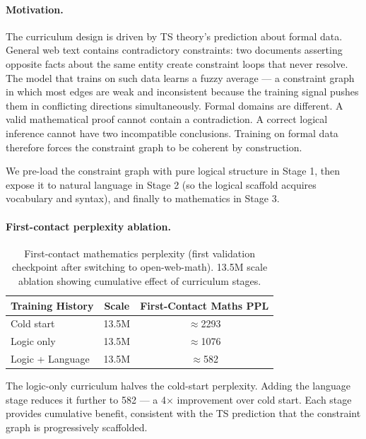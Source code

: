 \documentclass[10pt,a4paper]{article}
\begin{document}
\paragraph{Motivation.} The curriculum design is driven by TS theory's prediction about formal data. General web text contains contradictory constraints: two documents asserting opposite facts about the same entity create constraint loops that never resolve. The model that trains on such data learns a fuzzy average --- a constraint graph in which most edges are weak and inconsistent because the training signal pushes them in conflicting directions simultaneously. Formal domains are different. A valid mathematical proof cannot contain a contradiction. A correct logical inference cannot have two incompatible conclusions. Training on formal data therefore forces the constraint graph to be coherent by construction.

We pre-load the constraint graph with pure logical structure in Stage 1, then expose it to natural language in Stage 2 (so the logical scaffold acquires vocabulary and syntax), and finally to mathematics in Stage 3.

\paragraph{First-contact perplexity ablation.}

\begin{table}[h]
\centering
\caption{First-contact mathematics perplexity (first validation checkpoint after switching to open-web-math). 13.5M scale ablation showing cumulative effect of curriculum stages.}
\label{tab:curriculum13m}
\vspace{4pt}
\begin{tabular}{lcc}
\toprule
Training History & Scale & First-Contact Maths PPL \\
\midrule
Cold start & 13.5M & $\approx$2293 \\
Logic only & 13.5M & $\approx$1076 \\
Logic + Language & 13.5M & $\approx$582 \\
\bottomrule
\end{tabular}
\end{table}

The logic-only curriculum halves the cold-start perplexity. Adding the language stage reduces it further to 582 --- a 4$\times$ improvement over cold start. Each stage provides cumulative benefit, consistent with the TS prediction that the constraint graph is progressively scaffolded.
\end{document}
